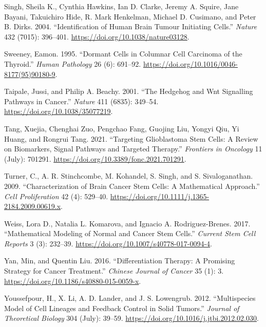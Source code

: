 \documentclass[
  letterpaper,
]{scrreprt}
\newlength{\cslhangindent}
\newenvironment{CSLReferences}[2] %
 {\begin{list}{}{%
  \setlength{\itemindent}{0pt}
  \setlength{\leftmargin}{0pt}
  \setlength{\parsep}{0pt}
  \ifodd #1
   \setlength{\leftmargin}{\cslhangindent}
   \setlength{\itemindent}{-1\cslhangindent}
  \fi
  \setlength{\itemsep}{#2\baselineskip}}}
 {\end{list}}
\theoremstyle{definition}
\theoremstyle{remark}
\begin{document}
\begin{CSLReferences}{1}{0}
Singh, Sheila K., Cynthia Hawkins, Ian D. Clarke, Jeremy A. Squire, Jane
Bayani, Takuichiro Hide, R. Mark Henkelman, Michael D. Cusimano, and
Peter B. Dirks. 2004. {``Identification of Human Brain Tumour Initiating
Cells.''} \emph{Nature} 432 (7015): 396--401.
\url{https://doi.org/10.1038/nature03128}.

Sweeney, Eamon. 1995. {``Dormant Cells in Columnar Cell Carcinoma of the
Thyroid.''} \emph{Human Pathology} 26 (6): 691--92.
\url{https://doi.org/10.1016/0046-8177(95)90180-9}.

Taipale, Jussi, and Philip A. Beachy. 2001. {``The Hedgehog and Wnt
Signalling Pathways in Cancer.''} \emph{Nature} 411 (6835): 349--54.
\url{https://doi.org/10.1038/35077219}.

Tang, Xuejia, Chenghai Zuo, Pengchao Fang, Guojing Liu, Yongyi Qiu, Yi
Huang, and Rongrui Tang. 2021. {``Targeting Glioblastoma Stem Cells: A
Review on Biomarkers, Signal Pathways and Targeted Therapy.''}
\emph{Frontiers in Oncology} 11 (July): 701291.
\url{https://doi.org/10.3389/fonc.2021.701291}.

Turner, C., A. R. Stinchcombe, M. Kohandel, S. Singh, and S.
Sivaloganathan. 2009. {``Characterization of Brain Cancer Stem Cells: A
Mathematical Approach.''} \emph{Cell Proliferation} 42 (4): 529--40.
\url{https://doi.org/10.1111/j.1365-2184.2009.00619.x}.

Weiss, Lora D., Natalia L. Komarova, and Ignacio A. Rodriguez-Brenes.
2017. {``Mathematical Modeling of Normal and Cancer Stem Cells.''}
\emph{Current Stem Cell Reports} 3 (3): 232--39.
\url{https://doi.org/10.1007/s40778-017-0094-4}.

Yan, Min, and Quentin Liu. 2016. {``Differentiation Therapy: A Promising
Strategy for Cancer Treatment.''} \emph{Chinese Journal of Cancer} 35
(1): 3. \url{https://doi.org/10.1186/s40880-015-0059-x}.

Youssefpour, H., X. Li, A. D. Lander, and J. S. Lowengrub. 2012.
{``Multispecies Model of Cell Lineages and Feedback Control in Solid
Tumors.''} \emph{Journal of Theoretical Biology} 304 (July): 39--59.
\url{https://doi.org/10.1016/j.jtbi.2012.02.030}.

\end{CSLReferences}
\end{document}
